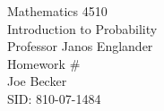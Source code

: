 \begin{titlepage}
\setlength{\topmargin}{1.5in}
\begin{center}
\Huge{Mathematics 4510} \\
\LARGE{Introduction to Probability} \\
\Large{Professor Janos Englander} \\[1cm]

\huge{Homework \#\HWnum}\\[0.5cm]

\large{Joe Becker} \\
\large{SID: 810-07-1484} \\
\large{\due} 

\end{center}

\end{titlepage}

